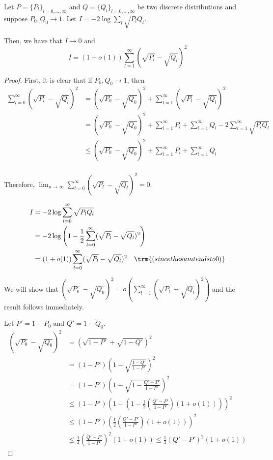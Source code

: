\documentclass{article}
\begin{document}
\begin{lemma}
\label{lem:simplify_renyi}
Let $P = \{ P_l \}_{l = 0,..., \infty}$ and $Q = \{ Q_l \}_{l=0,...,\infty}$ be two discrete distributions and suppose $P_0, Q_0 \rightarrow 1$. Let $I = - 2 \log \sum_l \sqrt{ P_l Q_l}$.

Then, we have that $I \rightarrow 0$ and 
\[
I = (1 + o(1)) \sum_{l = 1}^\infty (\sqrt{P_l} - \sqrt{Q_l})^2 
\]

\end{lemma}

\begin{proof}
First, it is clear that if $P_0, Q_0 \rightarrow 1$, then 
\begin{align*}
\sum_{l=0}^\infty (\sqrt{P_l} - \sqrt{Q_l})^2 &= 
   (\sqrt{P_0} - \sqrt{Q_0})^2 + \sum_{l=1}^\infty (\sqrt{P_l} - \sqrt{Q_l})^2 \\
 &= (\sqrt{P_0} - \sqrt{Q_0})^2 + \sum_{l=1}^\infty P_l + \sum_{l=1}^\infty Q_l - 
  2 \sum_{l=1}^\infty \sqrt{P_l Q_l} \\
 &\leq  (\sqrt{P_0} - \sqrt{Q_0})^2 + \sum_{l=1}^\infty P_l + \sum_{l=1}^\infty Q_l \\
\end{align*}

Therefore, $\lim_{n\rightarrow \infty} \sum_{l=0}^\infty (\sqrt{P_l} - \sqrt{Q_l})^2 = 0$. 

\begin{align*}
I &= -2 \log \sum_{l=0}^\infty \sqrt{P_l Q_l} \\
  &= -2 \log \left( 1 - \frac{1}{2} \sum_{l=0}^\infty (\sqrt{P_l} - \sqrt{Q_l})^2 \right) \\ 
  &= (1 + o(1)) \sum_{l=0}^\infty (\sqrt{P_l} - \sqrt{Q_l})^2 \quad \trm{(since the sum tends to 0)}
\end{align*}

We will show that $(\sqrt{P_0} - \sqrt{Q_0})^2 = o \left( \sum_{l=1}^\infty (\sqrt{P_l} - \sqrt{Q_l} )^2 \right)$ and the result follows immediately.

Let $P' = 1 - P_0$ and $Q' = 1 - Q_0$. 
\begin{align*}
(\sqrt{P_0} - \sqrt{Q_0})^2 &= (\sqrt{1-P'} + \sqrt{1-Q'})^2 \\
  &= (1-P') \left( 1 - \sqrt{ \frac{1-Q'}{1-P'}} \right)^2 \\
 &= (1-P') \left( 1 - \sqrt{ 1 - \frac{Q' - P'}{1 - P'} } \right)^2 \\
 &\leq (1-P') \left( 1 - (1 - \frac{1}{2} \left( \frac{Q' - P'}{1 - P'} \right) (1+o(1)) ) \right)^2 \\
 &\leq (1 - P') \left( \frac{1}{2} \left( \frac{Q'-P'}{1-P'} \right) (1+o(1)) \right)^2 \\
 &\leq \frac{1}{4} \left( \frac{Q' - P'}{1 - P'} \right)^2 (1 + o(1)) \leq \frac{1}{4} ( Q' - P')^2 (1 + o(1)) 
\end{align*}


\end{proof}
\end{document}
